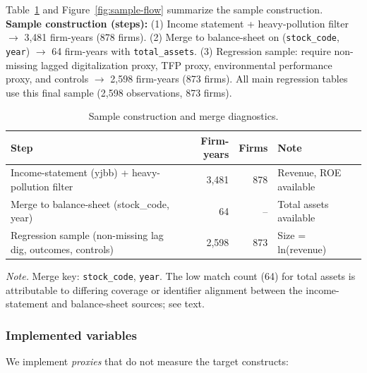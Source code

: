 Table~\ref{tab:merge-diagnostics} and Figure~\ref{fig:sample-flow} summarize the sample construction. \textbf{Sample construction (steps):} (1) Income statement + heavy-pollution filter $\rightarrow$ 3,481 firm-years (878 firms). (2) Merge to balance-sheet on (\texttt{stock\_code}, \texttt{year}) $\rightarrow$ 64 firm-years with \texttt{total\_assets}. (3) Regression sample: require non-missing lagged digitalization proxy, TFP proxy, environmental performance proxy, and controls $\rightarrow$ 2,598 firm-years (873 firms). All main regression tables use this final sample (2,598 observations, 873 firms).

\begin{table}[htbp]
  \centering
  \caption{Sample construction and merge diagnostics.}
  \label{tab:merge-diagnostics}
  \small
  \begin{tabularx}{\textwidth}{@{}Xrrl@{}}
    \toprule
    Step & Firm-years & Firms & Note \\
    \midrule
    Income-statement (yjbb) + heavy-pollution filter & 3,481 & 878 & Revenue, ROE available \\
    Merge to balance-sheet (stock\_code, year) & 64 & -- & Total assets available \\
    Regression sample (non-missing lag dig, outcomes, controls) & 2,598 & 873 & Size = ln(revenue) \\
    \bottomrule
  \end{tabularx}
  \medskip
  \parbox{\textwidth}{\raggedright\footnotesize\textit{Note.} Merge key: \texttt{stock\_code}, \texttt{year}. The low match count (64) for total assets is attributable to differing coverage or identifier alignment between the income-statement and balance-sheet sources; see text.}
\end{table}

\subsubsection{Implemented variables}

We implement \emph{proxies} that do not measure the target constructs:

